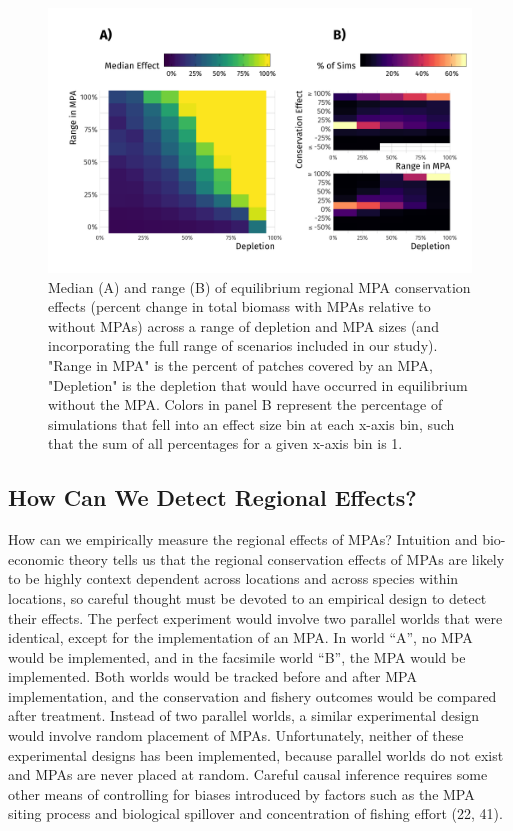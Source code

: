 \documentclass[9pt,twocolumn,twoside,lineno]{pnas-new}
\begin{document}
\begin{figure}%
  \centering
  \includegraphics[width=.9\linewidth]{figs/conservation-effect.png}
  \caption{Median (A) and range (B) of equilibrium regional MPA conservation effects (percent change in total biomass with MPAs relative to without MPAs) across a range of depletion and MPA sizes (and incorporating the full range of scenarios included in our study). "Range in MPA" is the percent of patches covered by an MPA, "Depletion" is the depletion that would have occurred in equilibrium without the MPA. Colors in panel B represent the percentage of simulations that fell into an effect size bin at each x-axis bin, such that the sum of all percentages for a given x-axis bin is 1.}
  \label{conservation-effects}
\end{figure}

\hypertarget{how-can-we-detect-regional-effects}{%
\subsection{How Can We Detect Regional
Effects?}\label{how-can-we-detect-regional-effects}}

How can we empirically measure the regional effects of MPAs? Intuition
and bio-economic theory tells us that the regional conservation effects
of MPAs are likely to be highly context dependent across locations and
across species within locations, so careful thought must be devoted to
an empirical design to detect their effects. The perfect experiment
would involve two parallel worlds that were identical, except for the
implementation of an MPA. In world ``A'', no MPA would be implemented,
and in the facsimile world ``B'', the MPA would be implemented. Both
worlds would be tracked before and after MPA implementation, and the
conservation and fishery outcomes would be compared after treatment.
Instead of two parallel worlds, a similar experimental design would
involve random placement of MPAs. Unfortunately, neither of these
experimental designs has been implemented, because parallel worlds do
not exist and MPAs are never placed at random. Careful causal inference
requires some other means of controlling for biases introduced by
factors such as the MPA siting process and biological spillover and
concentration of fishing effort (22, 41).
\end{document}
